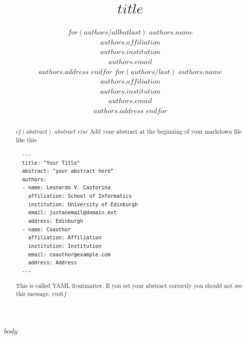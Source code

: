 \documentclass{article}
\title{$title$}
\author{%
$for(authors/allbutlast)$
  $authors.name$\\$authors.affiliation$\\$authors.institution$\\$authors.email$\\$authors.address$ \And
$endfor$
$for(authors/last)$
  $authors.name$\\$authors.affiliation$\\$authors.institution$\\$authors.email$\\$authors.address$
$endfor$
}
\begin{document}
\maketitle


\begin{abstract}
  $if(abstract)$
  $abstract$
  $else$
  Add your abstract at the beginning of your markdown file like this 
  \begin{verbatim}
  --- 
  title: "Your Title" 
  abstract: "your abstract here"
  authors:
  - name: Leonardo V. Castorina
    affiliation: School of Informatics
    institution: University of Edinburgh
    email: justanemail@domain.ext
    address: Edinburgh
  - name: Coauthor
    affiliation: Affiliation
    institution: Institution
    email: coauthor@example.com
    address: Address
  ---
  \end{verbatim}
  This is called YAML frontmatter. If you set your abstract correctly you should not see this message.
  $endif$
\end{abstract}


$body$

\end{document}
